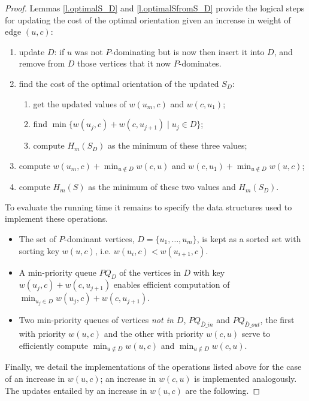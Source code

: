 \begin{proof}
Lemmas \ref{l.optimalS_D} and \ref{l.optimalSfromS_D} provide the logical steps
for updating the cost of the optimal orientation given an increase in weight of edge $(u,c)$:
\begin{enumerate}
	\item update $D$: if $u$ was not $P$-dominating but is now then insert it into $D$,
	and remove from $D$ those vertices that it now $P$-dominates.
	\item find the cost of the optimal orientation of the updated $S_D$:
	\begin{enumerate}
		\item get the updated values of $w(u_m,c)$ and $w(c,u_1)$;
		\item find $\min \{w(u_j,c)+w(c,u_{j+1}) \mid u_j\in D \}$;
		\item compute $H_m (S_D)$ as the minimum of these three values;
	\end{enumerate}
	\item compute $w(u_m,c)+\min_{u\notin D}w(c,u)$ and 
	        $w(c,u_1)+\min_{u\notin D} w(u,c)$;
	\item compute $H_m(S)$ as the minimum of these two values and $H_m(S_D)$.
\end{enumerate}
To evaluate the running time it remains to specify the data structures used to implement these operations. 
\begin{itemize}
	\item The set of $P$-dominant vertices, $D=\{u_1,\ldots,u_m\}$, is kept as a sorted set with sorting key
	 $w(u,c)$, i.e. $w(u_i,c)<w(u_{i+1},c)$. 
	\item A min-priority queue $PQ_D$ of the vertices in $D$ with key $w(u_j,c)+w(c,u_{j+1})$
	 enables efficient computation of $\min_{u_j\in D} w(u_j,c)+w(c,u_{j+1})$.
	\item Two min-priority queues of vertices \emph{not in $D$}, $PQ_{\bar{D}\_in}$
	and $PQ_{\bar{D}\_out}$, the first with priority $w(u,c)$ and 
	 the other with priority $w(c,u)$ serve to efficiently compute
	 $\min_{u\notin D} w(u,c)$ and $\min_{u\notin D}w(c,u)$. 
\end{itemize}
 Finally, we detail the implementations of the operations listed above
for the case of an increase in $w(u,c)$;  an increase in $w(c,u)$
 is implemented analogously. The updates entailed by an increase in $w(u,c)$
 are the following.


\end{proof}
